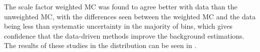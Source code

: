 The scale factor weighted \ac{MC} was found to agree better with data than the unweighted \ac{MC}, with the differences seen between the weighted \ac{MC} and the data being less than systematic uncertainty in the majority of bins, which gives confidence that the data-driven methods improve the background estimations. The results of these studies in the \METnoMU distribution can be seen in .
\begin{figure}


\end{figure}
